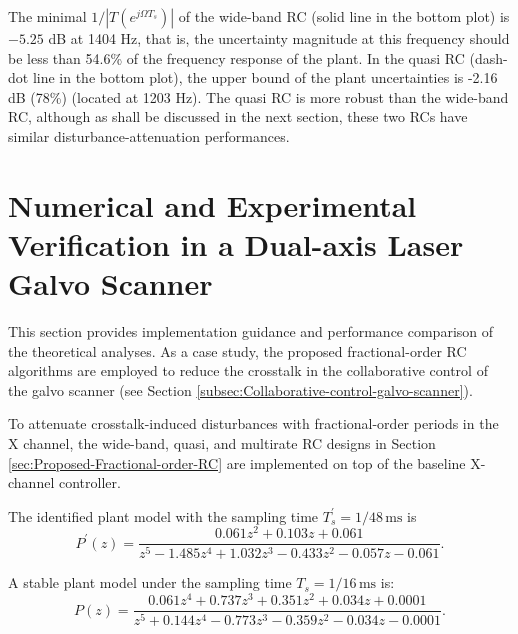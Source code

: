 \documentclass [11pt, proquest] {uwthesis}[2020/02/24]
\begin{document}
The minimal $1/|T(e^{j\Omega T_{s}})|$ of the wide-band RC (solid
line in the bottom plot) is $-5.25$ dB at 1404 Hz, that is, the uncertainty
magnitude at this frequency should be less than 54.6\% of the frequency
response of the plant. In the quasi RC (dash-dot line in the bottom
plot), the upper bound of the plant uncertainties is -2.16 dB (78\%)
(located at 1203 Hz). The quasi RC is more robust than the wide-band
RC, although as shall be discussed in the next section, these two
RCs have similar disturbance-attenuation performances. 

\section{Numerical and Experimental Verification in a Dual-axis Laser Galvo Scanner} \label{sec:Verification-Galvo-Scanner}

This section provides implementation guidance and performance comparison
of the theoretical analyses. As a case study, the proposed fractional-order
RC algorithms are employed to reduce the crosstalk in the collaborative
control of the galvo scanner (see Section \ref{subsec:Collaborative-control-galvo-scanner}).

To attenuate crosstalk-induced disturbances with fractional-order
periods in the X channel, the wide-band, quasi, and multirate RC designs
in Section \ref{sec:Proposed-Fractional-order-RC} are implemented on top of the baseline
X-channel controller.

The identified plant model with the sampling time $T_{s}^{'}=1/48\,\text{ms}$
is
\begin{equation}
P^{'}(z)=\frac{0.061z^{2}+0.103z+0.061}{z^{5}-1.485z^{4}+1.032z^{3}-0.433z^{2}-0.057z-0.061}.\label{eq:P_z}
\end{equation}

A stable plant model under the sampling time $T_{s}=1/16\,\text{ms}$
is:
\begin{equation}
P(z)=\frac{0.061z^{4}+0.737z^{3}+0.351z^{2}+0.034z+0.0001}{z^{5}+0.144z^{4}-0.773z^{3}-0.359z^{2}-0.034z-0.0001}.\label{eq:P_z-1}
\end{equation}
\end{document}
